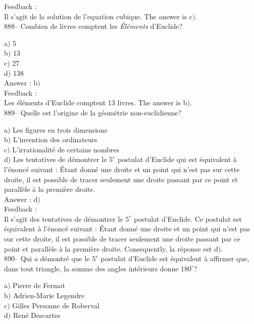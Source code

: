 ﻿\documentclass[letterpaper, 12pt]{article}
\begin{document}
Feedback :\\
Il s'agit de la solution de l'equation cubique. The answer is
c$)$.\\

888-- Combien de livres comptent les {\sl \'El\'ements} d'Euclide?

a$)$ 5 \\
b$)$ 13  \\
c$)$ 27 \\
d$)$ 138 \\

Answer : b$)$\\

Feedback : \\
Les \'el\'ements d'Euclide comptent 13 livres. The answer is b$)$.\\

889-- Quelle est l'origine de la g\'eom\'etrie non-euclidienne?

a$)$ Les figures en trois dimensions \\
b$)$ L'invention des ordinateurs  \\
c$)$ L'irrationalit\'e de certains nombres \\
d$)$ Les tentatives de d\'emontrer le $5^e$ postulat d'Euclide qui
est \'equivalent \`a l'\'enonc\'e suivant : \og\'Etant donn\'e une
droite et un point qui n'est pas sur cette droite, il est possible
de tracer seulement une droite passant
par ce point et parall\`ele \`a la premi\`ere droite\fg .\\

Answer : d$)$\\

Feedback : \\
Il s'agit des tentatives de d\'emontrer le $5^e$ postulat d'Euclide.
Ce postulat est \'equivalent \`a l'\'enonc\'e suivant : \og\'Etant
donn\'e une droite et un point qui n'est pas sur cette droite, il
est possible de tracer seulement une droite passant par ce point et
parall\`ele \`a la premi\`ere droite\fg . Consequently, la
r\'eponse est d$)$.\\

890-- Qui a d\'emontr\'e que le $5^e$ postulat d'Euclide est
\'equivalent \`a affirmer que, dans tout triangle, la somme des
angles int\'erieurs donne $180^{\circ}$?

a$)$ Pierre de Fermat \\
b$)$ Adrien-Marie Legendre   \\
c$)$ Gilles Personne de Roberval \\
d$)$ Ren\'e Descartes \\
\end{document}
